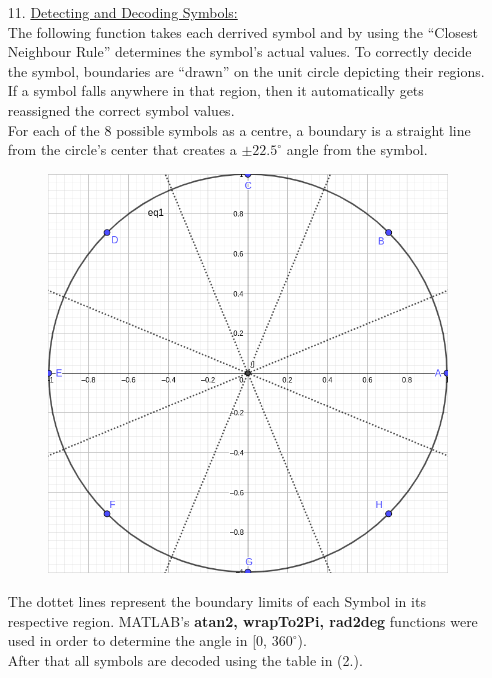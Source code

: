 \documentclass[12pt, a4paper]{article}
\begin{document}
\begin{enumerate}
\begin{enumerate}
\begin{figure}[H]
            \label{fig:example}%
        \end{figure}
        \item[11.] \underline{Detecting and Decoding Symbols:}\\
        The following function takes each derrived symbol and by using the ``Closest Neighbour Rule'' determines the symbol's actual values.
        To correctly decide the symbol, boundaries are ``drawn'' on the unit circle depicting their regions. If a symbol falls anywhere in 
        that region, then it automatically gets reassigned the correct symbol values.\\
        For each of the 8 possible symbols as a centre, a boundary is a straight line from the circle's center that creates a \(\pm 22.5^\circ \) angle
        from the symbol.
        \begin{figure}[H]
            \centering
            \includegraphics[scale=0.5]{geogebra.png}
        \end{figure}
        The dottet lines represent the boundary limits of each Symbol in its respective region.
        MATLAB's \textbf{atan2, wrapTo2Pi, rad2deg} functions were used in order to determine the angle in [0, \(360^{\circ}\)).\\
        After that all symbols are decoded using the table in (2.). 
        \begin{figure}[H]

\end{figure}
\end{enumerate}
\end{enumerate}
\end{document}
